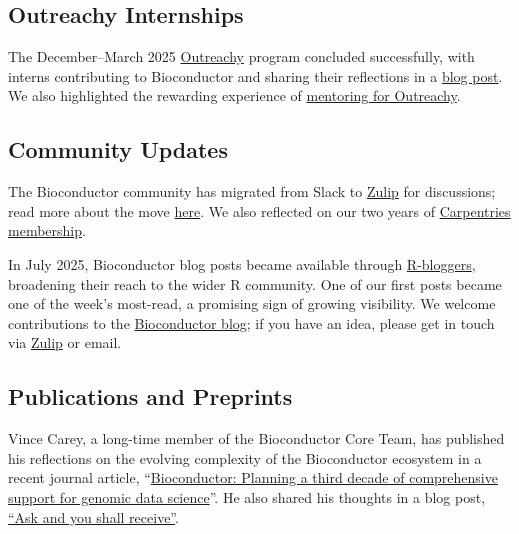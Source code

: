 \subsection{Outreachy Internships}\label{outreachy-internships}

The December--March 2025 \href{https://www.outreachy.org/}{Outreachy} program concluded successfully, with interns contributing to Bioconductor and sharing their reflections in a \href{https://blog.bioconductor.org/posts/2025-04-23-outreachy-interns-experience/}{blog post}. We also highlighted the rewarding experience of \href{https://blog.bioconductor.org/posts/2025-02-26-outreachy-mentoring/}{mentoring for Outreachy}.

\subsection{Community Updates}\label{community-updates}

The Bioconductor community has migrated from Slack to \href{https://bioconductor.zulipchat.com/}{Zulip} for discussions; read more about the move \href{https://blog.bioconductor.org/posts/2025-05-29-slack-to-zulip/}{here}. We also reflected on our two years of \href{https://blog.bioconductor.org/posts/2025-02-28-carpentries-update/}{Carpentries membership}.

In July 2025, Bioconductor blog posts became available through \href{https://www.r-bloggers.com/}{R-bloggers}, broadening their reach to the wider R community. One of our first posts became one of the week's most-read, a promising sign of growing visibility. We welcome contributions to the \href{https://blog.bioconductor.org/}{Bioconductor blog}; if you have an idea, please get in touch via \href{https://bioconductor.zulipchat.com/}{Zulip} or email.

\subsection{Publications and Preprints}\label{publications-and-preprints}

Vince Carey, a long-time member of the Bioconductor Core Team, has published his reflections on the evolving complexity of the Bioconductor ecosystem in a recent journal article, ``\href{https://doi.org/10.1016/j.patter.2025.101319}{Bioconductor: Planning a third decade of comprehensive support for genomic data science}''. He also shared his thoughts in a blog post, \href{https://blog.bioconductor.org/posts/2025-05-26-ask/}{``Ask and you shall receive''}.

